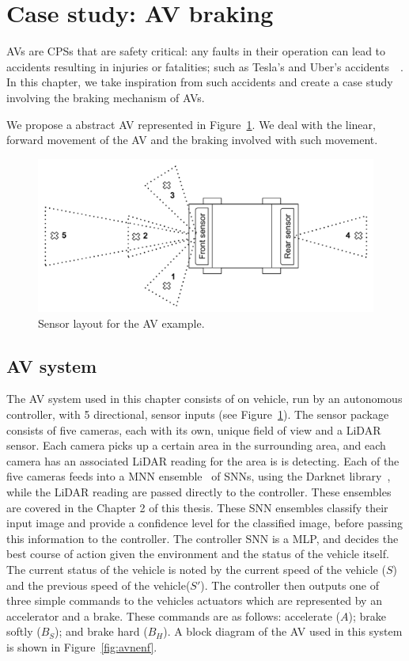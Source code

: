 \section{Case study: \acf{AV} braking}
\label{sec:case}

\acfp{AV} are \acfp{CPS} that are safety critical: any faults in their operation can lead to accidents resulting in injuries or fatalities; such as Tesla's and Uber's accidents~\cite{coldewey_2018}~\cite{stewart_2018}.
In this chapter, we take inspiration from such accidents and create a case study involving the braking mechanism of \acp{AV}.

We propose a abstract \acf{AV} represented in Figure~\ref{fig:av}.
We deal with the linear, forward movement of the \ac{AV} and the braking involved with such movement.

\begin{figure}[h]
	\centering
	\includegraphics[scale=0.4]{Content/fig/AV.pdf}
	\caption{Sensor layout for the \ac{AV} example. \label{fig:av}}
\end{figure}

\subsection{\acf{AV} system}
The \ac{AV} system used in this chapter consists of on vehicle, run by an autonomous controller, with 5 directional, sensor inputs (see Figure~\ref{fig:av}).
The sensor package consists of five cameras, each with its own, unique field of view and a \acf{LiDAR} sensor.
Each camera picks up a certain area in the surrounding area, and each camera has an associated \ac{LiDAR} reading for the area is is detecting.
Each of the five cameras feeds into a \acf{MNN} ensemble~\cite{Maqsood2004} of \acp{SNN}, using the Darknet library~\cite{darknet13}, while the \ac{LiDAR} reading are passed directly to the controller.
These ensembles are covered in the Chapter 2 of this thesis.
These \ac{SNN} ensembles classify their input image and provide a confidence level for the classified image, before passing this information to the controller.
The controller \ac{SNN} is a \ac{MLP}, and decides the best course of action given the environment and the status of the vehicle itself. 
The current status of the vehicle is noted by the current speed of the vehicle ($S$) and the previous speed of the vehicle($S'$).
The controller then outputs one of three simple commands to the vehicles actuators which are represented by an accelerator and a brake.
These commands are as follows: accelerate ($A$); brake softly ($B_S$); and brake hard ($B_H$).
A block diagram of the \ac{AV} used in this system is shown in Figure~\ref{fig:avnenf}. 

